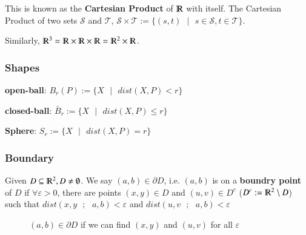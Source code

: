 \documentclass [12 pt, twoside] {book}
\newcommand\+{\text{ }}
\begin{document}
This is known as the \textbf{Cartesian Product} of $\varmathbb{R}$ with
itself. The Cartesian Product of two sets $\mathcal{S}$ and $\mathcal{T}$,
$\mathcal{S} \times \mathcal{T} :=  \{(s, t)\+|\+s\in\mathcal{S},
t\in\mathcal{T}\}$.

Similarly, $\varmathbb{R}^3 = \varmathbb{R} \times \varmathbb{R} \times
\varmathbb{R} = \varmathbb{R}^2 \times \varmathbb{R}$.

\subsubsection{Shapes}
\textbf{open-ball}:
$B_r(P) := \{X\+|\+dist(X, P) < r\}$

\textbf{closed-ball}:
$\bar{B}_r := \{X\+|\+ dist(X, P) \leq r\}$

\textbf{Sphere}:
$S_r := \{X\+|\+dist(X, P) = r\}$

\subsubsection{Boundary}

Given $D \subseteq \varmathbb{R}^2, D \neq \emptyset$. We say $(a, b) \in
\partial D$, i.e. $(a, b)$ is on a \textbf{boundry point} of $D$ if $\forall
\varepsilon > 0$, there are points $(x, y)\in D$ and $(u, v) \in D^c$ ($D^c :=
\varmathbb{R}^2 \setminus D$) such that $dist(x, y\+;\+ a, b) < \varepsilon$ and
$dist(u, v\+;\+ a, b) < \varepsilon$

\begin{figure}[ht]
    \centering
    \resizebox{0.4\textwidth}{!} {
    }
    \caption{$(a,b) \in \partial D$ if we can find $(x, y)$ and $(u, v)$ for all
    $\varepsilon$}
\end{figure}
\end{document}
